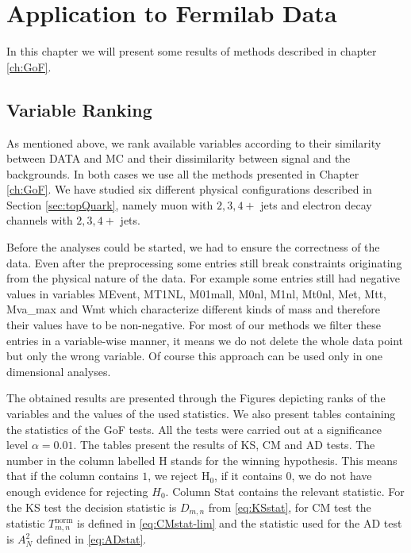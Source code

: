 \chapter{Application to Fermilab Data}\label{ch:FNAL_results}

\noindent In this chapter we will present some results of methods described in chapter \ref{ch:GoF}.

\section{Variable Ranking}
As mentioned above, we rank available variables according to their similarity between DATA and MC and their dissimilarity between signal and the backgrounds. In both cases we use all the methods presented in Chapter \ref{ch:GoF}. We have studied six different physical configurations described in Section \ref{sec:topQuark}, namely muon with $2, 3, 4+$ jets and electron decay channels with $2, 3, 4+$ jets.

Before the analyses could be started, we had to ensure the correctness of the data. Even after the preprocessing some entries still break constraints originating from the physical nature of the data. For example some entries still had negative values in variables \textsf{MEvent, MT1NL, M01mall, M0nl, M1nl, Mt0nl, Met, Mtt, Mva\_max} and \textsf{Wmt} which characterize different kinds of mass and therefore their values have to be non-negative. For most of our methods we filter these entries in a variable-wise manner, it means we do not delete the whole data point but only the wrong variable. Of course this approach can be used only in one dimensional analyses. 

The obtained results are presented through the Figures depicting ranks of the variables and the values of the used statistics. We also present tables containing the statistics of the GoF tests. All the tests were carried out at a significance level $\alpha = 0.01.$ The tables present the results of KS, CM and AD tests. The number in the column labelled \textsf{H} stands for the winning hypothesis. This means that if the column contains $1$, we reject $\mathrm{H}_0$, if it contains $0$, we do not have enough evidence for rejecting $H_0$. Column \textsf{Stat} contains the relevant statistic. For the KS test the decision statistic is $D_{m,n}$ from \eqref{eq:KSstat}, for  CM test the statistic $T^{\mathrm{norm}}_{m,n}$ is defined in \eqref{eq:CMstat-lim} and the statistic used for the AD test is $A_N^2$ defined in \eqref{eq:ADstat}. 

